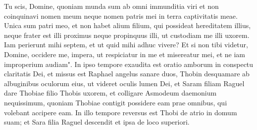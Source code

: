 \begin{biblechapter}
\verse Tu scis, Domine, quoniam munda sum ab omni immunditia viri 
\verse et non coinquinavi nomen meum neque nomen patris mei in terra captivitatis meae. Unica sum patri meo, et non habet alium filium, qui possideat hereditatem illius, neque frater est illi proximus neque propinquus illi, ut custodiam me illi uxorem. Iam perierunt mihi septem, et ut quid mihi adhuc vivere? Et si non tibi videtur, Domine, occidere me, impera, ut respiciatur in me et misereatur mei, et ne iam improperium audiam". 
\verse In ipso tempore exaudita est oratio amborum in conspectu claritatis Dei,  
\verse et missus est Raphael angelus sanare duos, Thobin desquamare ab albuginibus oculorum eius, ut videret oculis lumen Dei, et Saram filiam Raguel dare Thobiae filio Thobis uxorem, et colligare Asmodeum daemonium nequissimum, quoniam Thobiae contigit possidere eam prae omnibus, qui volebant accipere eam. In illo tempore reversus est Thobi de atrio in domum suam; et Sara filia Raguel descendit et ipsa de loco superiori. 
\end{biblechapter}

